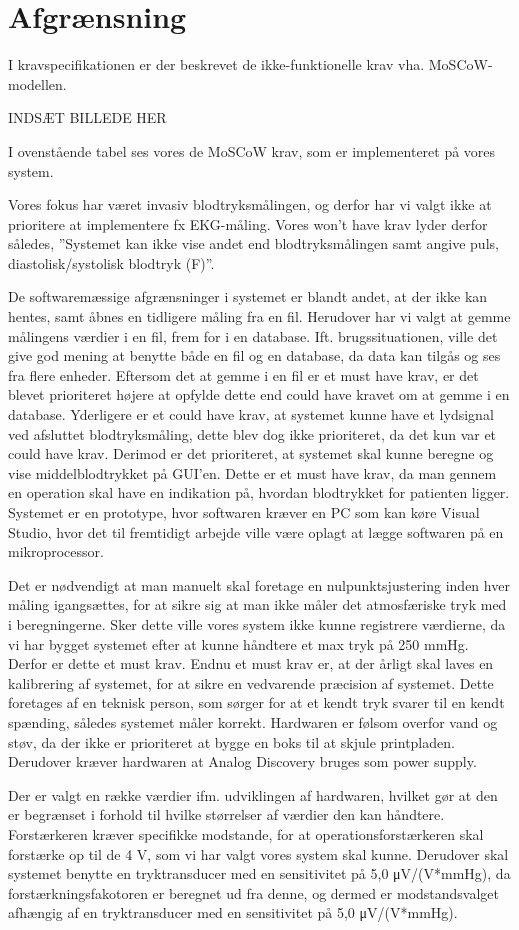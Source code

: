 \section{Afgrænsning}
I kravspecifikationen er der beskrevet de ikke-funktionelle krav vha. MoSCoW- modellen. 

INDSÆT BILLEDE HER

I ovenstående tabel ses vores de MoSCoW krav, som er implementeret på vores system.

Vores fokus har været invasiv blodtryksmålingen, og derfor har vi valgt ikke at prioritere at
implementere fx EKG-måling. Vores won't have krav lyder derfor således, ”Systemet kan ikke
vise andet end blodtryksmålingen samt angive puls, diastolisk/systolisk blodtryk (F)”.

De softwaremæssige afgrænsninger i systemet er blandt andet, at der ikke kan hentes, samt åbnes
en tidligere måling fra en fil. Herudover har vi valgt at gemme målingens værdier i en fil, frem
for i en database. Ift. brugssituationen, ville det give god mening at benytte både en fil og en
database, da data kan tilgås og ses fra flere enheder. Eftersom det at gemme i en fil er et must
have krav, er det blevet prioriteret højere at opfylde dette end could have kravet om at gemme i
en database. Yderligere er et could have krav, at systemet kunne have et lydsignal ved afsluttet
blodtryksmåling, dette blev dog ikke prioriteret, da det kun var et could have krav. Derimod er
det prioriteret, at systemet skal kunne beregne og vise middelblodtrykket på GUI'en. Dette er et
must have krav, da man gennem en operation skal have en indikation på, hvordan blodtrykket
for patienten ligger. Systemet er en prototype, hvor softwaren kræver en PC som kan køre Visual Studio, hvor det til fremtidigt arbejde ville være oplagt at lægge softwaren på en mikroprocessor.

Det er nødvendigt at man manuelt skal foretage en nulpunktsjustering inden hver måling
igangsættes, for at sikre sig at man ikke måler det atmosfæriske tryk med i beregningerne. Sker dette ville vores system ikke kunne registrere værdierne, da vi har bygget systemet efter at kunne håndtere et max tryk på 250 mmHg. Derfor er dette et must krav. Endnu et must krav er, at der årligt skal laves en kalibrering af systemet, for at sikre en vedvarende præcision af systemet. Dette
foretages af en teknisk person, som sørger for at et kendt tryk svarer til en kendt spænding,
således systemet måler korrekt. Hardwaren er følsom overfor vand og støv, da der ikke er prioriteret at bygge en boks til at skjule printpladen. Derudover kræver hardwaren at Analog Discovery bruges som power supply.

Der er valgt en række værdier ifm. udviklingen af hardwaren, hvilket gør at den er begrænset
i forhold til hvilke størrelser af værdier den kan håndtere. Forstærkeren kræver specifikke
modstande, for at operationsforstærkeren skal forstærke op til de 4 V, som vi har valgt vores
system skal kunne. Derudover skal systemet benytte en tryktransducer med en sensitivitet
på 5,0 μV/(V*mmHg), da forstærkningsfakotoren er beregnet ud fra denne, og dermed er
modstandsvalget afhængig af en tryktransducer med en sensitivitet på 5,0 μV/(V*mmHg).

\clearpage